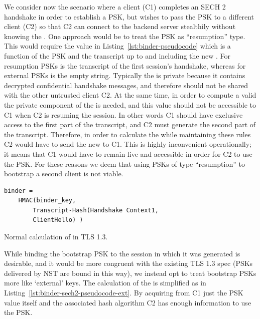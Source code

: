 We consider now the scenario where a client (C1) completes an SECH 2 handshake in order to establish a PSK, but wishes to pass the PSK to a different client (C2) so that C2 can connect to the backend server stealthily without knowing the . One approach would be to treat the \ac{PSK} as ``resumption'' type. This would require the  value in Listing~\ref{lst:binder-pseudocode} which is a function of the PSK and the transcript up to and including the new . For resumption \acp{PSK}  is the transcript of the first session's handshake, whereas for external \acp{PSK}  is the empty string. Typically the  is private because it contains decrypted confidential handshake messages, and therefore should not be shared with the other untrusted client C2. At the same time, in order to compute a valid  the private component of the  is needed, and this value should not be accessible to C1 when C2 is resuming the session. In other words C1 should have exclusive access to the first part of the transcript, and C2 must generate the second part of the transcript. Therefore, in order to calculate the  while maintaining these rules C2 would have to send the new  to C1. This is highly inconvenient operationally; it means that C1 would have to remain live and accessible in order for C2 to use the \ac{PSK}. For these reasons we deem that using \acp{PSK} of type ``resumption'' to bootstrap a second client is not viable.

\begin{listing}
    \begin{verbatim}
binder =
    HMAC(binder_key,
        Transcript-Hash(Handshake Context1,
        ClientHello) )
    \end{verbatim}
    \captionsetup{width=.8\linewidth} 
    \caption{\label{lst:binder-sech2-pseudocode}Normal calculation of  in TLS 1.3.}
\end{listing}

While binding the bootstrap \ac{PSK} to the session in which it was generated is desirable, and it would be more congruent with the existing TLS 1.3 spec (\acp{PSK} delivered by \ac{NST} are bound in this way), we instead opt to treat bootstrap \acp{PSK} more like `external' keys. The calculation of the  is simplified as in Listing~\ref{lst:binder-sech2-pseudocode-ext}. By acquiring from C1 just the \ac{PSK} value itself and the associated hash algorithm C2 has enough information to use the \ac{PSK}.

